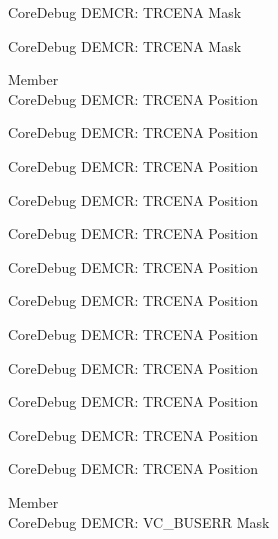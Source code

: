 \begin{DoxyRefList}
\label{deprecated__deprecated001156}%
%
Core\+Debug DEMCR\+: TRCENA Mask 

\label{deprecated__deprecated001258}%
%
Core\+Debug DEMCR\+: TRCENA Mask  
\item[Member \doxylink{group___c_m_s_i_s___core_debug_ga6ff2102b98f86540224819a1b767ba39}{Core\+Debug\+\_\+\+DEMCR\+\_\+\+TRCENA\+\_\+\+Pos} ]\hfill \\
\label{deprecated__deprecated000045}%
%
Core\+Debug DEMCR\+: TRCENA Position 

\label{deprecated__deprecated000189}%
%
Core\+Debug DEMCR\+: TRCENA Position 

\label{deprecated__deprecated000331}%
%
Core\+Debug DEMCR\+: TRCENA Position 

\label{deprecated__deprecated000407}%
%
Core\+Debug DEMCR\+: TRCENA Position 

\label{deprecated__deprecated000496}%
%
Core\+Debug DEMCR\+: TRCENA Position 

\label{deprecated__deprecated000598}%
%
Core\+Debug DEMCR\+: TRCENA Position 

\label{deprecated__deprecated000704}%
%
Core\+Debug DEMCR\+: TRCENA Position 

\label{deprecated__deprecated000848}%
%
Core\+Debug DEMCR\+: TRCENA Position 

\label{deprecated__deprecated000990}%
%
Core\+Debug DEMCR\+: TRCENA Position 

\label{deprecated__deprecated001066}%
%
Core\+Debug DEMCR\+: TRCENA Position 

\label{deprecated__deprecated001155}%
%
Core\+Debug DEMCR\+: TRCENA Position 

\label{deprecated__deprecated001257}%
%
Core\+Debug DEMCR\+: TRCENA Position  
\item[Member \doxylink{group___c_m_s_i_s___core_debug_ga9d29546aefe3ca8662a7fe48dd4a5b2b}{Core\+Debug\+\_\+\+DEMCR\+\_\+\+VC\+\_\+\+BUSERR\+\_\+\+Msk} ]\hfill \\
\label{deprecated__deprecated000060}%
%
Core\+Debug DEMCR\+: VC\+\_\+\+BUSERR Mask 


\end{DoxyRefList}
